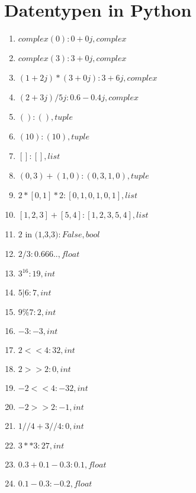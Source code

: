
\newcommand{\dozent}{Prof. Dr. Claudia Müller-Birn, Barry Linnert}					%
\newcommand{\tutor}{Thierry Meurers}						%
\newcommand{\tutoriumNo}{10}				%
\newcommand{\ubungNo}{02}									%
\newcommand{\veranstaltung}{Objektorientierte Programmierung}	%
\newcommand{\semester}{SoSe 17}						%
\newcommand{\studenten}{Stefaan Hessmann, Jaap Pedersen, Mark Niehues}			%




\section{Datentypen in Python}

\begin{enumerate}
\item $complex(0): 0+0j, complex$
\item $complex(3): 3+0j, complex$
\item $(1+2j)*(3+0j): 3+6j, complex$
\item $(2+3j)/5j: 0.6-0.4j, complex$
\item $(): (), tuple$
\item $(10): (10), tuple$
\item $[]: [], list$
\item $(0,3)+(1,0): (0,3,1,0), tuple$
\item $2*[0,1]*2: [0,1,0,1,0,1], list$
\item $[1,2,3]+[5,4]: [1,2,3,5,4], list$
\item $\text{2 in (1,3,3)}: False, bool$
\item $2/3: 0.666.., float$
\item $3^16: 19, int$
\item $5|6: 7, int$
\item $9\%7: 2, int$
\item $-3: -3, int$
\item $2<<4: 32, int$
\item $2>>2: 0, int$
\item $-2<<4: -32, int$
\item $-2>>2: -1, int$
\item $1//4+3//4: 0, int$
\item $3**3: 27, int$
\item $0.3+0.1-0.3: 0.1, float$
\item $0.1-0.3: -0.2, float$
\end{enumerate}


